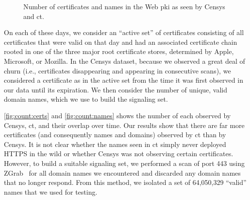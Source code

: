 \begin{figure}
  \centering
  \caption{Number of certificates and names in the Web \ac{pki} as seen by
  Censys and \ac{ct}.}
  \label{fig:count}
\end{figure}

On each of these days, we consider an ``active set'' of certificates consisting
of all certificates that were valid on that day and had an associated
certificate chain rooted in one of the three major root certificate stores,
determined by Apple, Microsoft, or Mozilla. In the Censys dataset, because we
observed a great deal of churn (i.e., certificates disappearing and appearing in
consecutive scans), we considered a certificate as in the active set from the
time it was first observed in our data until its expiration. We then consider
the number of unique, valid domain names, which we use to build the signaling
set.

\autoref{fig:count:certs} and \autoref{fig:count:names} shows the number of each
observed by Censys, \ac{ct}, and their overlap over time. Our results show that
there are far more certificates (and consequently names and domains) observed by
\ac{ct} than by Censys. It is not clear whether the names seen in \ac{ct} simply
never deployed HTTPS in the wild or whether Censys was not observing certain
certificates. However, to build a suitable signaling set, we performed a scan of
port 443 using ZGrab~\cite{durumeric2015search} for all domain names we
encountered and discarded any domain names that no longer respond. From this
method, we isolated a set of 64,050,329 ``valid'' names that we used for testing.

